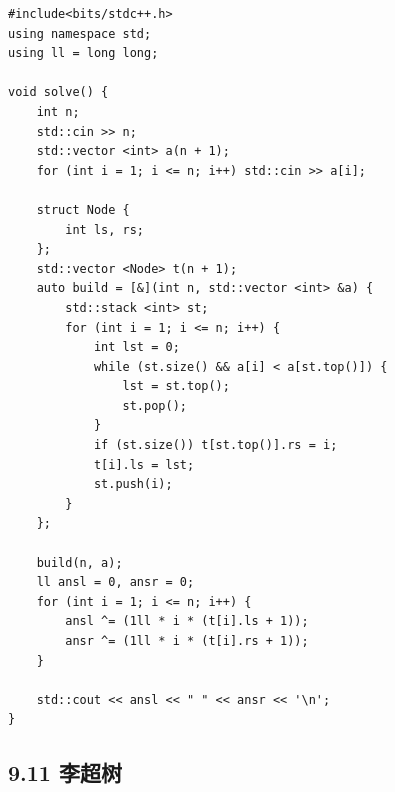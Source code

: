 \documentclass[UTF8,a4paper,11pt]{ctexart}
\begin{document}
\begin{Verbatim}[fontsize=\small,frame=single,breaklines=true,breakanywhere=true]
#include<bits/stdc++.h>
using namespace std;
using ll = long long;

void solve() {
    int n;
    std::cin >> n;
    std::vector <int> a(n + 1);
    for (int i = 1; i <= n; i++) std::cin >> a[i];

    struct Node {
        int ls, rs;
    };
    std::vector <Node> t(n + 1);
    auto build = [&](int n, std::vector <int> &a) {
        std::stack <int> st;
        for (int i = 1; i <= n; i++) {
            int lst = 0;
            while (st.size() && a[i] < a[st.top()]) {
                lst = st.top(); 
                st.pop();
            } 
            if (st.size()) t[st.top()].rs = i;
            t[i].ls = lst;
            st.push(i);
        }
    };

    build(n, a);
    ll ansl = 0, ansr = 0;
    for (int i = 1; i <= n; i++) {
        ansl ^= (1ll * i * (t[i].ls + 1));
        ansr ^= (1ll * i * (t[i].rs + 1));
    }

    std::cout << ansl << " " << ansr << '\n';
}

\end{Verbatim}

\subsection*{9.11 李超树}
\end{document}
